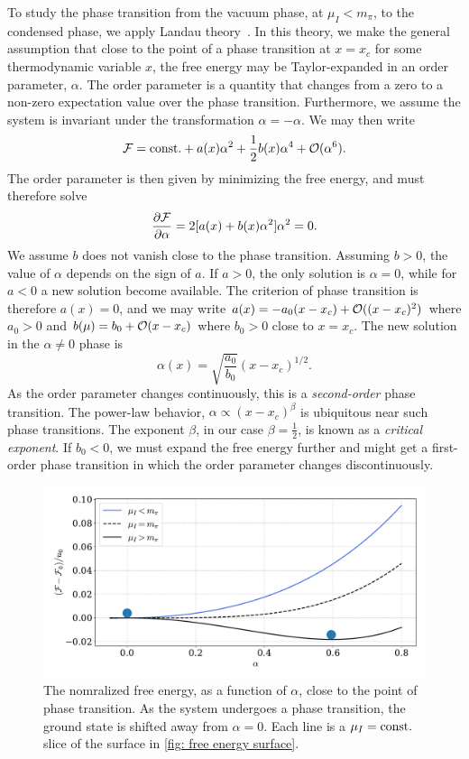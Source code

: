 To study the phase transition from the vacuum phase, at $\mu_I < m_\pi$, to the condensed phase, we apply Landau theory~\autocite{peskinIntroductionQuantumField1995}.
In this theory, we make the general assumption that close to the point of a phase transition at $x = x_c$ for some thermodynamic variable $x$, the free energy may be Taylor-expanded in an order parameter, $\alpha$.
The order parameter is a quantity that changes from a zero to a non-zero expectation value over the phase transition.
Furthermore, we assume the system is invariant under the transformation $\alpha = -\alpha$.
We may then write
%
\begin{equation}
    \mathcal{F} = \mathrm{const.} + a(x)\alpha^2 + \frac{1}{2} b(x)\alpha^4 + \mathcal O(\alpha^6).
\end{equation}
%
The order parameter is then given by minimizing the free energy, and must therefore solve
%
\begin{equation}
    \pdv{\mathcal{F}}{\alpha} = 2[a(x) + b(x) \alpha^2]\alpha^2 = 0.
\end{equation}
%
We assume $b$ does not vanish close to the phase transition.
Assuming $b > 0$, the value of $\alpha$ depends on the sign of $a$.
If $a>0$, the only solution is $\alpha = 0$, while for $a<0$ a new solution become available.
The criterion of phase transition is therefore $a(x) = 0$, and we may write $a(x) = -a_0(x - x_c) + \mathcal O((x - x_c)^2)$ where $a_0 > 0$ and $b(\mu) = b_0 + \mathcal O(x - x_c)$ where $b_0>0$ close to $x = x_c$. 
The new solution in the $\alpha \neq 0$ phase is
%
\begin{equation}
    \alpha(x) = \sqrt{\frac{a_0}{b_0}}(x - x_c)^{1/2}.
\end{equation}
%
As the order parameter changes continuously, this is a \emph{second-order} phase transition.
The power-law behavior, $\alpha \propto (x - x_c)^\beta$ is ubiquitous near such phase transitions.
The exponent $\beta$, in our case $\beta = \frac{1}{2}$, is known as a \emph{critical exponent}.
If $b_0<0$, we must expand the free energy further and might get a first-order phase transition in which the order parameter changes discontinuously.

\begin{figure}[!htb]
    \centering
    \includegraphics[width=.8\textwidth]{../scripts/figurer/phase_transition.pdf}
    \caption{
        The nomralized free energy, as a function of $\alpha$, close to the point of phase transition. 
        As the system undergoes a phase transition, the ground state is shifted away from $\alpha = 0$.
        Each line is a $\mu_I=\mathrm{const.}$ slice of the surface in \autoref{fig: free energy surface}.
        }
    \label{fig: phase transition}
\end{figure}

